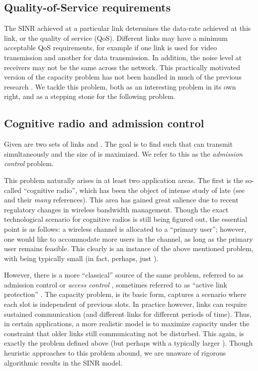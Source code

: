 \documentclass[11pt]{amsart}
\begin{document}
\subsection*{Quality-of-Service requirements}

The SINR achieved at a particular link determines the data-rate achieved at this link, or the quality of service (QoS). Different links may have a minimum acceptable QoS requirements, for example if one link is used for video transmission and another for data transmission. In addition, the noise level at receivers may not be the same across the network. This practically motivated version of the capacity problem has not been handled in much of the previous research \cite{GHWW09,HW09,SODA11}.
We tackle this problem, both as an interesting problem in its own right, and as a stepping stone for the following problem.


\subsection*{Cognitive radio and admission control}
Given are two sets of links  and . The goal is to find   such that  can transmit simultaneously and the size of  is maximized.  We refer to this as the \emph{admission control} problem.

This problem naturally arises in at least two application areas. The first is the so-called ``cognitive radio'', which has been the object of intense study of late (see \cite{Bahl:2009:WSN:1592568.1592573,SuZhangCognitive,Levorato:2009:CIM:1793974.1793991} and their \emph{many} references). This area has gained great salience due to recent 
regulatory changes in wireless bandwidth management. Though the exact technological scenario for cognitive radios is still being figured out, the essential point is as follows: a wireless channel is allocated to a ``primary user''; however, one would like to accommodate more users in the channel, as long as the primary user remains feasible. 
This clearly is an instance of the above mentioned problem, with   being typically small (in fact, perhaps, just ).

However, there is a more ``classical'' source of the same problem, referred to as admission control or \emph{access control} \cite{GoldsmithSurvey,WuBertsekas}, sometimes referred to as ``active link protection'' \cite{ChiangSurvey}. The capacity problem, is its basic form, captures a scenario where each slot is independent of previous slots. In practice however, links can require sustained communication (and different links for different periods of time). Thus, in certain applications, a more realistic model is to maximize capacity under the constraint that older links still communicating not be disturbed. This again, is exactly the problem defined above (but perhaps with a typically larger ). Though heuristic approaches to this problem abound, we are unaware of rigorous algorithmic
results in the SINR model.
\end{document}
